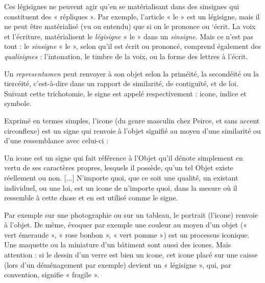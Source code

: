 Ces légisignes ne peuvent agir qu’en se matérialisant dans des sinsignes qui constituent des « répliques ». Par exemple, l’article « le » est un légisigne, mais il ne peut être matérialisé (vu ou entendu) que si on le prononce ou ‘écrit. La voix et l’écriture, matérialisent le \textit{légisigne} « le » dans un \textit{sinsigne}. Mais ce n’est pas tout : le \textit{sinsigne} « le », selon qu’il est écrit ou prononcé, comprend également des \textit{qualisignes} : l’intonation, le timbre de la voix, ou la forme des lettres à l’écrit.

Un \textit{representamen} peut renvoyer à son objet selon la priméité, la secondéité ou la tiercéité, c’est-à-dire dans un rapport de similarité, de contiguïté, et de loi. Suivant cette trichotomie, le signe est appelé respectivement : icone, indice et symbole.

Exprimé en termes simples, l’icone (du genre masculin chez Peirce, et sans accent circonflexe) est un signe qui renvoie à l’objet signifié au moyen d’une similarité ou d’une ressemblance avec celui-ci :
\begin{lecture}{}
Un icone est un signe qui fait référence à l’Objet qu’il dénote simplement en vertu de ses caractères propres, lesquels il possède, qu’un tel Objet existe réellement ou non. [...] N’importe quoi, que ce soit une qualité, un existant individuel, ou une loi, est un icone de n’importe quoi, dans la mesure où il ressemble à cette chose et en est utilisé comme le signe.
\end{lecture}
Par exemple sur une photographie ou sur un tableau, le portrait (l’icone) renvoie à l’objet. De même, évoquer par exemple une couleur au moyen d’un objet (« vert émeraude », « rose bonbon », « vert pomme ») est un processus iconique. Une maquette ou la miniature d’un bâtiment sont aussi des icones. Mais attention : si le dessin d’un verre est bien un icone, cet icone placé sur une caisse (lors d’un déménagement par exemple) devient un « légisigne », qui, par convention, signifie « fragile ».

